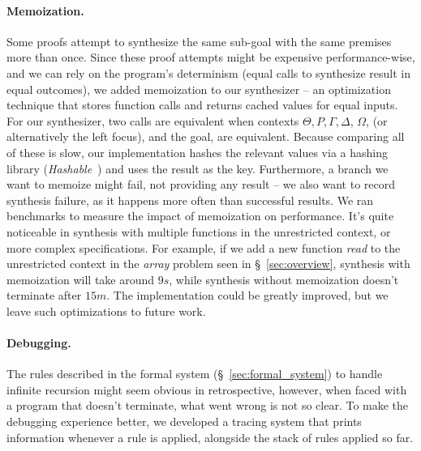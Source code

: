 \documentclass{llncs}
\newcommand{\mypara}[1]{\paragraph{\textbf{#1}.}}
\def\Rho{P}
\begin{document}
\mypara{Memoization} Some proofs attempt to synthesize the same
sub-goal with the same premises more than once. Since these proof
attempts might be expensive performance-wise, and we can rely on the
program's determinism (equal calls to synthesize result in equal
outcomes), we added memoization to our synthesizer -- an optimization
technique that stores function calls and returns cached values for
equal inputs.
%
For our synthesizer, two calls are equivalent when
contexts $\Theta, \Rho, \Gamma, \Delta$, $\Omega$, (or alternatively
the left focus), and the goal, are equivalent. Because comparing all
of these is slow, our implementation hashes the relevant values via a hashing
library (\emph{Hashable}~\cite{hashable}) and
uses the result as the key.
%
Furthermore, a branch we want to memoize
might fail, not providing any result -- we also want to record
synthesis failure, as it happens more often than successful
results. We ran benchmarks to measure the impact of memoization on 
performance. It's quite noticeable in synthesis with multiple
functions in the unrestricted context, or more complex
specifications. For example, if we add a new function \emph{read} to
the unrestricted context in the \emph{array} problem seen in
\S~\ref{sec:overview}, synthesis with memoization will take
around $9s$, while synthesis without memoization doesn't terminate
after $15m$.
%
The implementation could be greatly improved, but we
leave such optimizations to future work.



\mypara{Debugging} The rules described in the formal
system (\S~\ref{sec:formal_system}) to handle infinite recursion might seem obvious in
retrospective, however, when faced with a program that doesn't terminate, what
went wrong is not so clear.
To make the debugging experience better, we
developed a tracing system that prints information whenever a rule is applied,
alongside the stack of rules applied so far.
\end{document}

